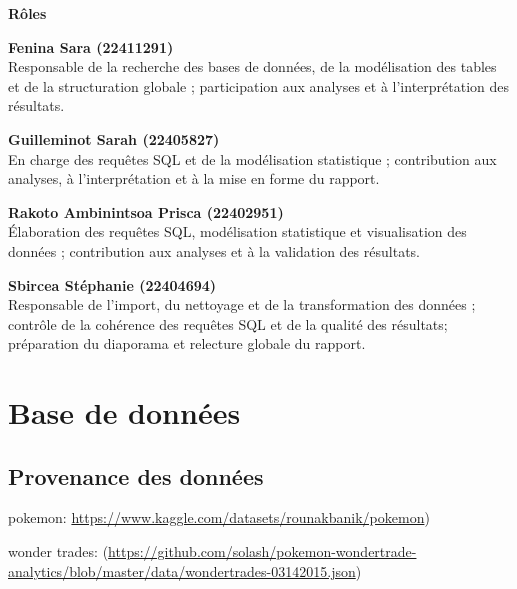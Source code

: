 \documentclass[mstat,12pt]{unswthesis}
\begin{document}
\begin{minipage}{\textwidth}
\vspace{1cm}

\textbf{Rôles}

\vspace{0.5cm}


\textbf{Fenina Sara (22411291)}\\
Responsable de la recherche des bases de données, de la modélisation des tables et de la structuration globale ; participation aux analyses et à l’interprétation des résultats.

\vspace{0.5cm}

\textbf{Guilleminot Sarah (22405827)}\\
En charge des requêtes SQL et de la modélisation statistique ; contribution aux analyses, à l’interprétation et à la mise en forme du rapport.

\vspace{0.5cm}

\textbf{Rakoto Ambinintsoa Prisca (22402951)}\\
Élaboration des requêtes SQL, modélisation statistique et visualisation des données ; contribution aux analyses et à la validation des résultats.

\vspace{0.5cm}

\textbf{Sbircea Stéphanie (22404694)}\\
Responsable de l'import, du nettoyage et de la transformation des données ; contrôle de la cohérence des requêtes SQL et de la qualité des résultats; préparation du diaporama et relecture globale du rapport.

\vspace{0.5cm}
\end{minipage}

\chapter{Base de données}\label{base-de-donnuxe9es}

\section{Provenance des données}\label{provenance-des-donnuxe9es}

pokemon: \url{https://www.kaggle.com/datasets/rounakbanik/pokemon})

\bigskip

wonder trades:
(\url{https://github.com/solash/pokemon-wondertrade-analytics/blob/master/data/wondertrades-03142015.json})
\end{document}
